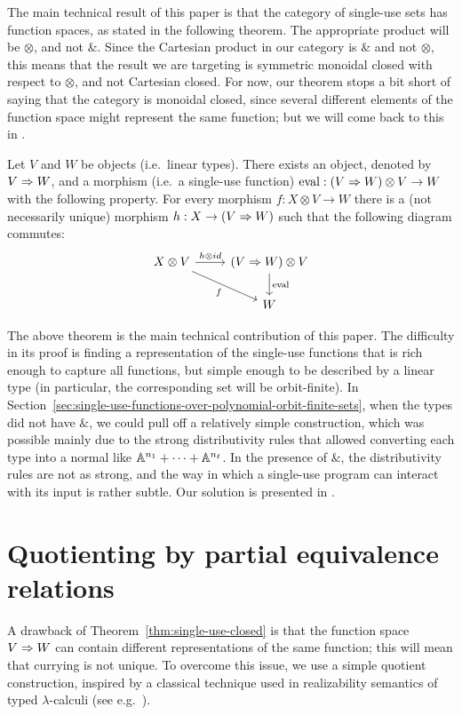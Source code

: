 \documentclass[a4paper,UKenglish,cleveref, autoref, numberwithinsect, thm-restate]{lipics-v2021}
\begin{document}
 
The main technical result of this paper is that the category of single-use sets has function spaces, as stated in the following theorem.  The appropriate product will be $\otimes$, and not $\&$. Since the Cartesian product in our category is $\&$ and not $\otimes$, this means that the result we are targeting is symmetric monoidal closed with respect to $\otimes$, and not Cartesian closed.  For now, our theorem stops a bit short of saying that the category is monoidal closed, since several different elements of the function space might represent the same function; but we will come back to this in .

\begin{theorem}\label{thm:single-use-closed}
    Let $V$ and $W$ be objects (i.e.~linear types). There exists an object, denoted by  $V \Rightarrow W$, and a morphism (i.e.~a single-use function)
    $\mathrm{eval} : (V \Rightarrow W) \otimes V \to  W$
    with the following property. For every morphism
    $f : {X \otimes V} \to  W$
    there is a (not necessarily unique) morphism
    $h :  X \to (V \Rightarrow W)$
    such that the following diagram commutes:
    \[
    \begin{tikzcd}
    X \otimes V 
    \arrow[r,"h \otimes id"]
    \arrow[dr,"f"']
    &
    (\funspace V W) \otimes V
    \arrow[d,"\mathrm{eval}"] \\
    &
    W
    \end{tikzcd}
    \]
\end{theorem}

The above theorem is the main technical contribution of this paper. The difficulty in its proof is finding a representation of the single-use  functions that is rich enough to capture all functions, but simple enough to be described by a linear type (in particular, the corresponding set will be orbit-finite). In  Section~\ref{sec:single-use-functions-over-polynomial-orbit-finite-sets}, when the types did not have $\&$, we could pull off a relatively simple construction, which was possible mainly due to the strong distributivity rules that allowed converting each type into a normal like $\mathbb A^{n_1} + \cdots + \mathbb A^{n_\ell}$. In the presence of $\&$, the distributivity rules are not as strong, and the way in which a single-use program can interact with its input is rather subtle. 
Our solution is presented in .

\section{Quotienting by partial equivalence relations}
\label{sec:quotient-category}
A drawback of Theorem~\ref{thm:single-use-closed} is that the function space $V \Rightarrow W$ can contain different representations of the same function; this will mean that currying is not unique. To overcome this issue, we use a simple quotient construction, inspired by a classical technique used in realizability semantics of typed $\lambda$-calculi (see e.g.~\cite[Chapter~15]{AmadioCurien}).
\end{document}
